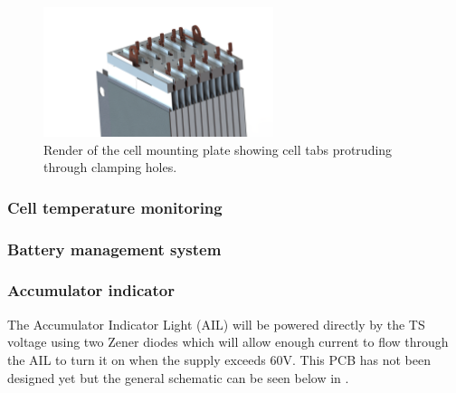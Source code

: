 \documentclass{article}
\begin{document}
\begin{figure}
\centering
\includegraphics[width=0.6\textwidth]{accumulator_tabs.png}
\caption{Render of the cell mounting plate showing cell tabs protruding through clamping holes.}
\label{fig:cell_tabs}
\end{figure}

\subsubsection{Cell temperature monitoring}\label{accumulator_cell_temperature_monitoring}

\subsubsection{Battery management system}\label{accumulator_battery_management_system}


\subsubsection{Accumulator indicator}\label{accumulator_indicator}
The Accumulator Indicator Light (AIL) will be powered directly by the TS voltage using two Zener diodes which will allow enough current to flow through the AIL to turn it on when the supply exceeds 60V. This PCB has not been designed yet but the general schematic can be seen below in . \\
\end{document}
